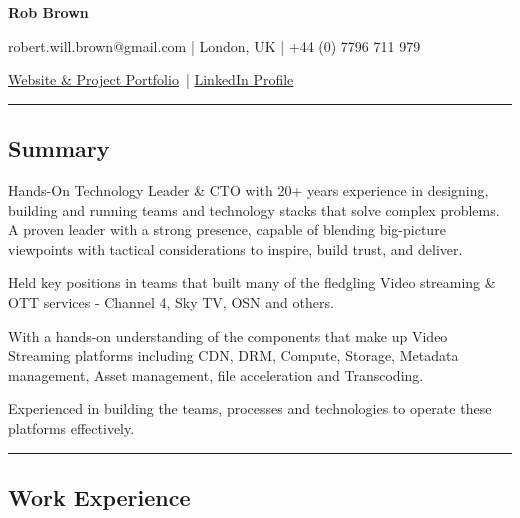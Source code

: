 \documentclass[10pt,a4paper]{article}
\begin{document}
\begin{center}
  {\LARGE \textbf{Rob Brown}}

  robert.will.brown@gmail.com |
  London, UK |
  +44 (0) 7796 711 979

  \href{https://robert-will-brown.github.io}{Website \& Project Portfolio}\ |
  \href{https://www.linkedin.com/in/robert-w-brown/}{LinkedIn Profile}
\end{center}

\hrule
\vspace{-0.4em}
\subsection*{Summary}

\begin{itemize*}
\item[] Hands-On Technology Leader \& CTO with 20+ years experience in designing, building and running teams and technology stacks that solve complex problems. A proven leader with a strong presence, capable of blending big-picture viewpoints with tactical considerations to inspire, build trust, and deliver.

\vspace{+0.4em}
Held key positions in teams that built many of the fledgling Video streaming \& OTT services - Channel 4, Sky TV, OSN and others.

\vspace{+0.4em}
With a hands-on understanding of the components that make up Video Streaming platforms including CDN, DRM, Compute, Storage, Metadata management, Asset management, file acceleration and Transcoding.

\vspace{+0.4em}
Experienced in building the teams, processes and technologies to operate these platforms effectively.

\end{itemize*}


\hrule
\vspace{-0.4em}
\subsection*{Work Experience}
\end{document}
